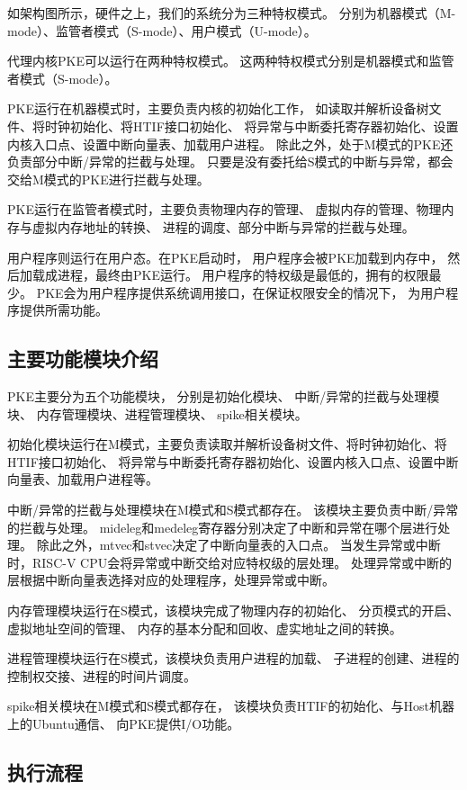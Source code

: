 如架构图所示，硬件之上，我们的系统分为三种特权模式。
分别为机器模式（M-mode）、监管者模式（S-mode）、用户模式（U-mode）。

代理内核PKE可以运行在两种特权模式。
这两种特权模式分别是机器模式和监管者模式（S-mode）。

PKE运行在机器模式时，主要负责内核的初始化工作，
如读取并解析设备树文件、将时钟初始化、将HTIF接口初始化、
将异常与中断委托寄存器初始化、设置内核入口点、设置中断向量表、加载用户进程。
除此之外，处于M模式的PKE还负责部分中断/异常的拦截与处理。
只要是没有委托给S模式的中断与异常，都会交给M模式的PKE进行拦截与处理。

PKE运行在监管者模式时，主要负责物理内存的管理、
虚拟内存的管理、物理内存与虚拟内存地址的转换、
进程的调度、部分中断与异常的拦截与处理。

用户程序则运行在用户态。在PKE启动时，
用户程序会被PKE加载到内存中，
然后加载成进程，最终由PKE运行。
用户程序的特权级是最低的，拥有的权限最少。
PKE会为用户程序提供系统调用接口，在保证权限安全的情况下，
为用户程序提供所需功能。

\subsection{主要功能模块介绍}

PKE主要分为五个功能模块，
分别是初始化模块、
中断/异常的拦截与处理模块、
内存管理模块、进程管理模块、
spike相关模块\cite{PKE_GitHub}。

初始化模块运行在M模式，主要负责读取并解析设备树文件、将时钟初始化、将HTIF接口初始化、
将异常与中断委托寄存器初始化、设置内核入口点、设置中断向量表、加载用户进程等。

中断/异常的拦截与处理模块在M模式和S模式都存在。
该模块主要负责中断/异常的拦截与处理。
mideleg和medeleg寄存器分别决定了中断和异常在哪个层进行处理。
除此之外，mtvec和stvec决定了中断向量表的入口点。
当发生异常或中断时，RISC-V CPU会将异常或中断交给对应特权级的层处理。
处理异常或中断的层根据中断向量表选择对应的处理程序，处理异常或中断。

内存管理模块运行在S模式，该模块完成了物理内存的初始化、
分页模式的开启、虚拟地址空间的管理、
内存的基本分配和回收、虚实地址之间的转换。

进程管理模块运行在S模式，该模块负责用户进程的加载、
子进程的创建、进程的控制权交接、进程的时间片调度。

spike相关模块在M模式和S模式都存在，
该模块负责HTIF的初始化、与Host机器上的Ubuntu通信、
向PKE提供I/O功能。

\subsection{执行流程}

